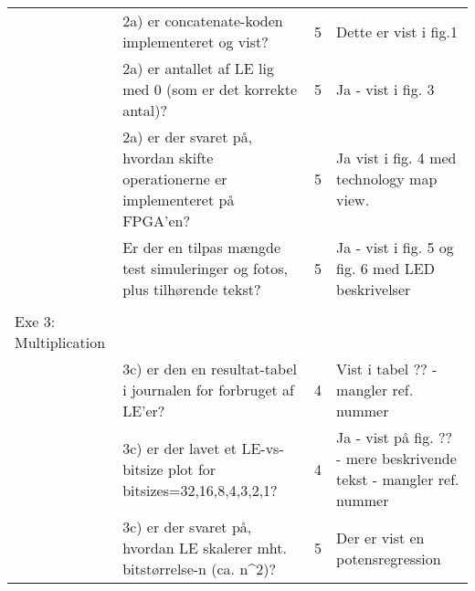 \begin{table}[h]
\begin{tabularx}{\textwidth}{p{3.5cm}Xp{5mm}X}
                                              & 2a) er concatenate-koden implementeret og vist?                                                     & 5 & Dette er vist i fig.1                                                                                   \\
                                              & 2a) er antallet af LE lig med 0 (som er det korrekte antal)?                                        & 5 & Ja - vist i fig. 3                                                                                      \\
                                              & 2a) er der svaret på, hvordan skifte operationerne er implementeret på FPGA’en?                     & 5 & Ja  vist i fig. 4 med technology map view.                                                              \\
                                              & Er der en tilpas mængde test simuleringer og fotos, plus tilhørende tekst?                          & 5 & Ja - vist i fig. 5 og fig. 6 med LED beskrivelser                                                       \\
                                              &                                                                                                     &   &                                                                                                         \\\midrule
        Exe 3: Multiplication                 &                                                                                                     &   &                                                                                                         \\
                                              & 3c) er den en resultat-tabel i journalen for forbruget af LE’er?                                    & 4 & Vist i tabel ?? - mangler ref. nummer                                                                   \\
                                              & 3c) er der lavet et LE-vs-bitsize plot for bitsizes=32,16,8,4,3,2,1?                                & 4 & Ja - vist på fig. ?? - mere beskrivende tekst - mangler ref. nummer                                     \\
                                              & 3c) er der svaret på, hvordan LE skalerer mht. bitstørrelse-n (ca. n\textasciicircum{}2)?           & 5 & Der er vist en potensregression                                                                         \\

\end{tabularx}
\end{table}
